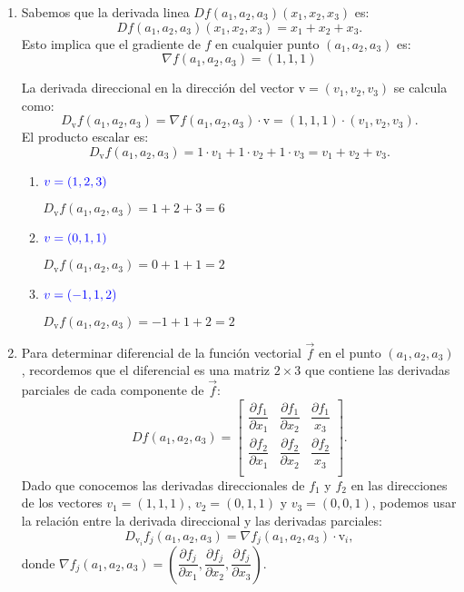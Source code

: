 \begin{enumerate}[label=\color{red}\textbf{\arabic*)}, leftmargin=*]
\item {}

Sabemos que la derivada linea $Df(a_1,a_2,a_3)(x_1,x_2,x_3)$ es: \[ Df(a_{1},a_{2},a_{3})(x_1,x_2,x_3)=x_1+x_2+x_3. \]Esto implica que el gradiente de $f$ en cualquier punto $(a_1,a_2,a_3)$ es: \[ \nabla f(a_1,a_2,a_3)=(1,1,1) \]

La derivada direccional en la dirección del vector $\mathrm{v}=(v_1,v_2,v_3)$ se calcula como: \[ D_{\mathrm{v}}f(a_1,a_2,a_3)=\nabla f(a_1,a_2,a_3)\cdot\mathrm{v}=(1,1,1)\cdot(v_1,v_2,v_3). \]El producto escalar es: \[D_{\mathrm{v}}f(a_1,a_2,a_3)=1\cdot v_1+1\cdot v_2+1\cdot v_3=v_1+v_2+v_3.  \]
\begin{enumerate}[label=\color{red}\textbf{\alph*)}]
	\item $\textcolor{blue}{v=(1,2,3)}$
	
	$D_{\mathrm{v}}f(a_1,a_2,a_3)=1+2+3=6$
	
	\item $\textcolor{blue}{v=(0,1,1)}$
	
	$D_{\mathrm{v}}f(a_1,a_2,a_3)=0+1+1=2$
	
	\item $\textcolor{blue}{v=(-1,1,2)}$
	
	$D_{\mathrm{v}}f(a_{1},a_2,a_3)=-1+1+2=2$
\end{enumerate}

\item {}

Para determinar diferencial de la función vectorial $\vec{f}$ en el punto $(a_1,a_2,a_3)$, recordemos que el diferencial es una matriz $2\times 3$ que contiene las derivadas parciales de cada componente de $\vec{f}$: \[ Df(a_1,a_2,a_3)=\begin{bmatrix}
\dfrac{\partial f_1}{\partial x_1} & \dfrac{\partial f_1}{\partial x_2} & \dfrac{\partial f_1}{x_3}\\
\dfrac{\partial f_2}{\partial x_1} & \dfrac{\partial f_2}{\partial x_2} & \dfrac{\partial f_2}{x_3}\\
\end{bmatrix}. \]
Dado que conocemos las derivadas direccionales de $f_1$ y $f_2$ en las direcciones de los vectores $v_1=(1,1,1)$, $v_2=(0,1,1)$ y $v_3=(0,0,1)$, podemos usar la relación entre la derivada direccional y las derivadas parciales: \[ D_{\mathrm{v}_i}f_j(a_1,a_2,a_3)=\nabla f_j(a_1,a_2,a_3)\cdot \mathrm{v}_i, \]donde $\nabla f_j(a_1,a_2,a_3)=\left(\dfrac{\partial f_j}{\partial x_1},\dfrac{\partial f_j}{\partial x_2},\dfrac{\partial f_j}{\partial x_3}\right)$.


\end{enumerate}
